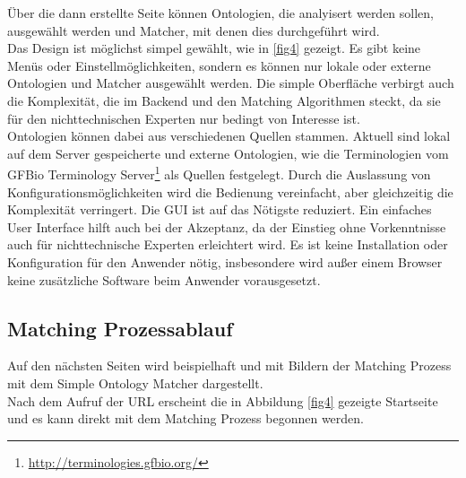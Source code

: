 		Über die dann erstellte Seite können Ontologien, die
		analyisert werden sollen, ausgewählt werden und Matcher, mit denen dies durchgeführt wird.\\
		Das Design ist möglichst simpel gewählt, wie in \ref{fig4} gezeigt. Es gibt
		keine Menüs oder Einstellmöglichkeiten, sondern es können nur
		lokale oder externe Ontologien und Matcher ausgewählt
		werden. Die simple Oberfläche verbirgt auch die Komplexität, die im Backend
		und den Matching Algorithmen steckt, da sie für den nichttechnischen Experten
		nur bedingt von Interesse ist.\\
		Ontologien können dabei aus verschiedenen Quellen stammen. Aktuell
		sind lokal auf dem Server gespeicherte und externe Ontologien, wie
		die Terminologien vom GFBio Terminology
		Server\footnote{\url{http://terminologies.gfbio.org/}} als Quellen festgelegt.
		Durch die Auslassung von Konfigurationsmöglichkeiten wird die Bedienung
		vereinfacht, aber gleichzeitig die Komplexität verringert. Die GUI ist auf
		das Nötigste reduziert. Ein einfaches User Interface hilft auch bei der Akzeptanz, da der
		Einstieg ohne Vorkenntnisse auch für nichttechnische Experten erleichtert
		wird. Es ist keine Installation oder Konfiguration für den Anwender nötig,
		insbesondere wird außer einem Browser keine zusätzliche Software beim Anwender
		vorausgesetzt.
		
		\pagebreak[4]
		
		\subsection{Matching Prozessablauf}
		Auf den nächsten Seiten wird beispielhaft und mit Bildern der Matching Prozess
		mit dem Simple Ontology Matcher dargestellt.\\
		Nach dem Aufruf der URL erscheint die in Abbildung \ref{fig4} gezeigte
		Startseite und es kann direkt mit dem Matching Prozess begonnen werden.\\
		\begin{minipage}{\linewidth}
			\label{fig4}
		\end{minipage}
		
